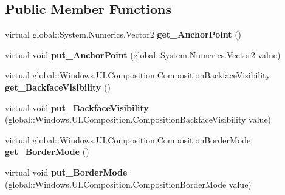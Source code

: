 \subsection*{Public Member Functions}
\begin{DoxyCompactItemize}
\item 
\mbox{\label{class_windows_1_1_u_i_1_1_composition_1_1_visual_a5c51998e94ec1776d9b212fef7f643c6}} 
virtual global\+::\+System.\+Numerics.\+Vector2 {\bfseries get\+\_\+\+Anchor\+Point} ()
\item 
\mbox{\label{class_windows_1_1_u_i_1_1_composition_1_1_visual_aa1b0464e36040159979a9f686b078861}} 
virtual void {\bfseries put\+\_\+\+Anchor\+Point} (global\+::\+System.\+Numerics.\+Vector2 value)
\item 
\mbox{\label{class_windows_1_1_u_i_1_1_composition_1_1_visual_ab37e8a416eb15adcf52595af082a3080}} 
virtual global\+::\+Windows.\+U\+I.\+Composition.\+Composition\+Backface\+Visibility {\bfseries get\+\_\+\+Backface\+Visibility} ()
\item 
\mbox{\label{class_windows_1_1_u_i_1_1_composition_1_1_visual_a3b737ed77f1a9773db7d7bba9085d735}} 
virtual void {\bfseries put\+\_\+\+Backface\+Visibility} (global\+::\+Windows.\+U\+I.\+Composition.\+Composition\+Backface\+Visibility value)
\item 
\mbox{\label{class_windows_1_1_u_i_1_1_composition_1_1_visual_aadde0309db11b0ab71defebf5ac36226}} 
virtual global\+::\+Windows.\+U\+I.\+Composition.\+Composition\+Border\+Mode {\bfseries get\+\_\+\+Border\+Mode} ()
\item 
\mbox{\label{class_windows_1_1_u_i_1_1_composition_1_1_visual_ad4fd972123d9a322d431e5f8790ba7b9}} 
virtual void {\bfseries put\+\_\+\+Border\+Mode} (global\+::\+Windows.\+U\+I.\+Composition.\+Composition\+Border\+Mode value)
\item 
\mbox{\label{class_windows_1_1_u_i_1_1_composition_1_1_visual_a35059d715a23e7424f1d2560320e1cab}} 

\end{DoxyCompactItemize}
